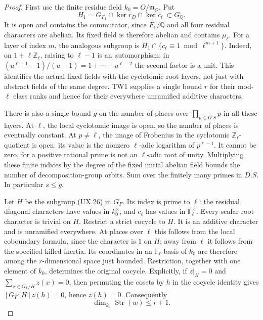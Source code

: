 \begin{proof}
First use the finite residue field $k_0=O/\mathfrak m_O$.
Put
\[
 H_1=G_{F_1}\cap\ker\bar r_D\cap\ker\bar c_\ell
       \ \subset G_{\mathbb Q}.
 \tag{UX.26}
\]
It is open and contains the commutator, since $F_1/\mathbb Q$
and all four residual characters are abelian.  Its fixed
field is therefore abelian and contains $\mu_\ell$.
For a layer of index $m$, the analogous subgroup is
$H_1\cap\{c_\ell\equiv1\bmod\ell^{m+1}\}$.  Indeed, on
$1+\ell\mathbb Z_\ell$, raising to $\ell-1$ is an
automorphism: in
$(u^{\ell-1}-1)/(u-1)=1+\cdots+u^{\ell-2}$ the second
factor is a unit.  This identifies the actual fixed fields
with the cyclotomic root layers, not just with abstract
fields of the same degree.  TW1 supplies a single bound $r$
for their mod-$\ell$ class ranks and hence for their
everywhere unramified additive characters.

There is also a single bound $g$ on the number of places
over $\prod_{p\in D.S}p$ in all these layers.  At $\ell$,
the local cyclotomic image is open, so the number of
places is eventually constant.  At $p\ne\ell$, the image
of Frobenius in the cyclotomic $\mathbb Z_\ell$-quotient
is open: its value is the nonzero $\ell$-adic logarithm
of $p^{\ell-1}$.  It cannot be zero, for a positive
rational prime is not an $\ell$-adic root of unity.
Multiplying these finite indices by the degree of the
fixed initial abelian field bounds the number of
decomposition-group orbits.  Sum over the finitely
many primes in $D.S$.  In particular $s\le g$.

Let $H$ be the subgroup (UX.26) in $G_F$.  Its index is
prime to $\ell$: the residual diagonal characters have
values in $k_0^\times$, and $\bar c_\ell$ has values in
$\mathbb F_\ell^\times$.  Every scalar root character
is trivial on $H$.  Restrict a strict cocycle to $H$.
It is an additive character and is unramified
everywhere.  At places over $\ell$ this follows from
the local coboundary formula, since the character is
$1$ on $H$; away from $\ell$ it follows from the
specified killed inertia.  Its coordinates in an
$\mathbb F_\ell$-basis of $k_0$ are therefore among
the $r$-dimensional space just bounded.
Restriction, together with one element of $k_0$,
determines the original cocycle.  Explicitly, if
$z|_H=0$ and $\sum_{x\in G_F/H}z(x)=0$, then
permuting the cosets by $h$ in the cocycle identity
gives $[G_F:H]z(h)=0$, hence $z(h)=0$.
Consequently
\[
 \dim_{k_0}\operatorname{Str}(w)\le r+1.
 \tag{UX.27}
\]


\end{proof}
